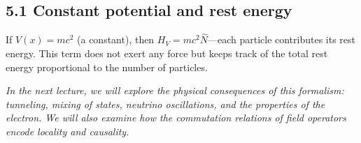 \documentclass[12pt,a4paper]{article}
\begin{document}
\subsection{5.1 Constant potential and rest energy}

If $V(x) = mc^2$ (a constant), then $H_V = mc^2\hat{N}$---each particle contributes its rest energy.  This term does not exert any force but keeps track of the total rest energy proportional to the number of particles.

\medskip
\noindent\textit{In the next lecture, we will explore the physical consequences of this formalism: tunneling, mixing of states, neutrino oscillations, and the properties of the electron.  We will also examine how the commutation relations of field operators encode locality and causality.}
\end{document}
